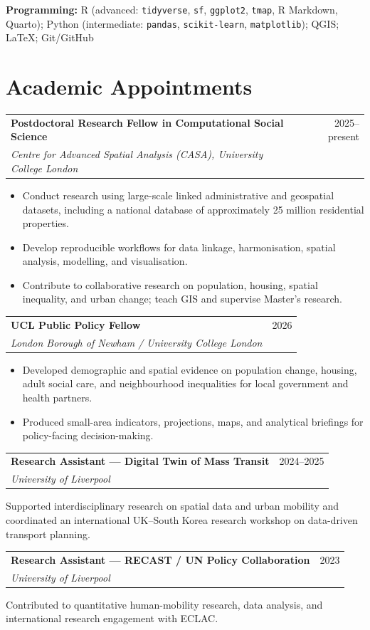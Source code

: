 \documentclass[a4paper,10.5pt]{article}
\makeatletter
\newcommand{\cventry}[3]{%
  \vspace{3.5pt}
  \begin{tabular*}{\textwidth}
    {@{}p{0.80\textwidth}@{\extracolsep{\fill}}r@{}}
    {\small\textbf{#1}} &
    {\small\color{mutedtext} #3} \\[-0.5pt]
    {\small\textit{#2}} &
  \end{tabular*}
  \vspace{1pt}
}
\newcommand{\compactentry}[3]{%
  \vspace{3pt}
  \begin{tabular*}{\textwidth}
    {@{}p{0.80\textwidth}@{\extracolsep{\fill}}r@{}}
    {\small\textbf{#1}} &
    {\small\color{mutedtext} #3} \\[-0.5pt]
    {\small\textit{#2}} &
  \end{tabular*}
  \vspace{0.5pt}
}
\newcommand{\skillline}[2]{%
  \vspace{2pt}
  {\small\textbf{#1:} #2\par}
}
\newcommand{\cvbullet}[1]{%
  \item {\small #1}
}
\makeatother
\begin{document}
\skillline{Programming}{
R (advanced: \texttt{tidyverse}, \texttt{sf}, \texttt{ggplot2},
\texttt{tmap}, R Markdown, Quarto);
Python (intermediate: \texttt{pandas}, \texttt{scikit-learn},
\texttt{matplotlib});
QGIS; \LaTeX; Git/GitHub
}

\section{Academic Appointments}

\cventry
{Postdoctoral Research Fellow in Computational Social Science}
{Centre for Advanced Spatial Analysis (CASA), University College London}
{2025--present}

\begin{itemize}
  \cvbullet{Conduct research using large-scale linked administrative and geospatial datasets, including a national database of approximately 25 million residential properties.}
  \cvbullet{Develop reproducible workflows for data linkage, harmonisation, spatial analysis, modelling, and visualisation.}
  \cvbullet{Contribute to collaborative research on population, housing, spatial inequality, and urban change; teach GIS and supervise Master's research.}
\end{itemize}

\cventry
{UCL Public Policy Fellow}
{London Borough of Newham / University College London}
{2026}

\begin{itemize}
  \cvbullet{Developed demographic and spatial evidence on population change, housing, adult social care, and neighbourhood inequalities for local government and health partners.}
  \cvbullet{Produced small-area indicators, projections, maps, and analytical briefings for policy-facing decision-making.}
\end{itemize}

\compactentry
{Research Assistant --- Digital Twin of Mass Transit}
{University of Liverpool}
{2024--2025}

{\small
Supported interdisciplinary research on spatial data and urban mobility and
coordinated an international UK--South Korea research workshop on data-driven
transport planning.
}

\compactentry
{Research Assistant --- RECAST / UN Policy Collaboration}
{University of Liverpool}
{2023}

{\small
Contributed to quantitative human-mobility research, data analysis, and
international research engagement with ECLAC.
}
\end{document}

